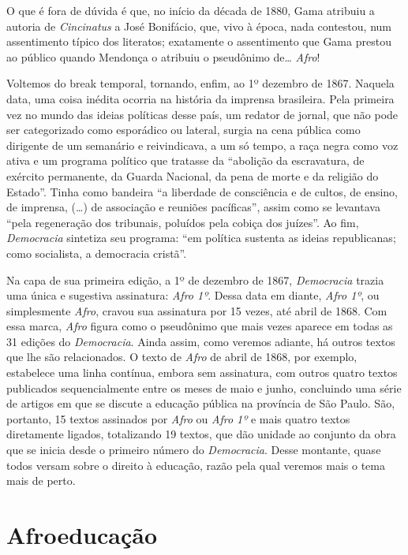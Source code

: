 O que é fora de dúvida é que, no início da década de 1880, Gama atribuiu
a autoria de \emph{Cincinatus} a José Bonifácio, que, vivo à época, nada
contestou, num assentimento típico dos literatos; exatamente o
assentimento que Gama prestou ao público quando Mendonça o atribuiu o
pseudônimo de\ldots{} \emph{Afro}!

Voltemos do break temporal, tornando, enfim, ao 1º dezembro de 1867.
Naquela data, uma coisa inédita ocorria na história da imprensa
brasileira. Pela primeira vez no mundo das ideias políticas desse país,
um redator de jornal, que não pode ser categorizado como esporádico ou
lateral, surgia na cena pública como dirigente de um semanário e
reivindicava, a um só tempo, a raça negra como voz ativa e um programa
político que tratasse da ``abolição da escravatura, de exército
permanente, da Guarda Nacional, da pena de morte e da religião do
Estado''. Tinha como bandeira ``a liberdade de consciência e de cultos, de
ensino, de imprensa, (\ldots{}) de associação e reuniões pacíficas'', assim
como se levantava ``pela regeneração dos tribunais, poluídos pela
cobiça dos juízes''. Ao fim, \emph{Democracia} sintetiza seu programa:
``em política sustenta as ideias republicanas; como socialista, a
democracia cristã''.

Na capa de sua primeira edição, a 1º de dezembro de 1867,
\emph{Democracia} trazia uma única e sugestiva assinatura: \emph{Afro
1º}. Dessa data em diante, \emph{Afro 1º}, ou simplesmente \emph{Afro},
cravou sua assinatura por 15 vezes, até abril de 1868. Com essa marca,
\emph{Afro} figura como o pseudônimo que mais vezes aparece em todas as
31 edições do \emph{Democracia}. Ainda assim, como veremos adiante, há
outros textos que lhe são relacionados. O texto de \emph{Afro} de abril
de 1868, por exemplo, estabelece uma linha contínua, embora sem
assinatura, com outros quatro textos publicados sequencialmente entre os
meses de maio e junho, concluindo uma série de artigos em que se discute
a educação pública na província de São Paulo. São, portanto, 15 textos
assinados por \emph{Afro} ou \emph{Afro 1º} e mais quatro textos
diretamente ligados, totalizando 19 textos, que dão unidade ao conjunto
da obra que se inicia desde o primeiro número do \emph{Democracia}.
Desse montante, quase todos versam sobre o direito à educação, razão
pela qual veremos mais o tema mais de perto.

\section{Afroeducação}

